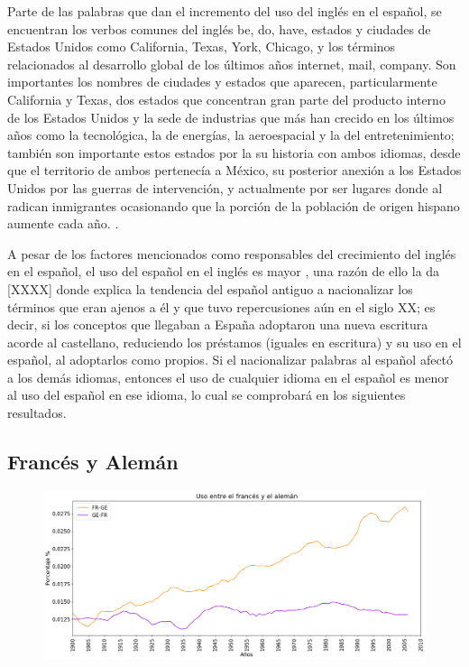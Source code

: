 Parte de las palabras que dan el incremento del uso del inglés en el español, se encuentran los verbos comunes del inglés be, do, have, estados y ciudades de Estados Unidos  como California, Texas, York, Chicago, y los términos relacionados al desarrollo global de los últimos años internet, mail, company.  Son importantes los nombres de ciudades y estados que aparecen, particularmente California y Texas, dos estados que concentran gran parte del producto interno de los Estados Unidos y la sede de industrias que más han crecido en los últimos años como la tecnológica,  la de energías, la aeroespacial y  la del entretenimiento; también son importante estos estados por la su historia con ambos idiomas, desde que el territorio de ambos pertenecía  a México,  su posterior anexión a los Estados Unidos por las guerras  de intervención,  y actualmente por ser lugares donde al radican inmigrantes ocasionando que la porción de la población de origen hispano aumente cada año. .

A pesar de los factores mencionados como responsables del crecimiento del inglés en el español,  el uso del español en el inglés es mayor , una razón de ello la da [XXXX] donde explica la tendencia del español antiguo a nacionalizar los términos que eran ajenos a él y que tuvo repercusiones aún en el siglo XX; es decir, si los conceptos que llegaban a España adoptaron una nueva escritura acorde al castellano,  reduciendo los préstamos (iguales en escritura)  y su uso en el español, al adoptarlos como propios. Si el nacionalizar palabras al español afectó a los demás idiomas, entonces el uso de cualquier idioma en el español es menor al uso del español en ese idioma, lo cual se comprobará en los siguientes resultados.



\subsection{Francés y Alemán}

\begin{figure}[h!]
	\centering
	\includegraphics[scale=.38]{Cap_3/SF_2_S2_FR.png}
	\label{SF_FG}
	\caption{}
\end{figure}

